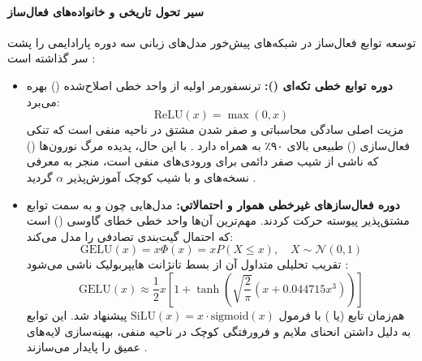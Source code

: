 \paragraph*{سیر تحول تاریخی و خانواده‌های فعال‌ساز}
توسعه توابع فعال‌ساز در شبکه‌های پیش‌خور مدل‌های زبانی سه دوره پارادایمی را پشت سر گذاشته است \cite{katirci2024evaluating}:
\begin{itemize}
    \item \textbf{دوره توابع خطی تکه‌ای ():} ترنسفورمر اولیه از واحد خطی اصلاح‌شده () \cite{nair2010relu} بهره می‌برد:
    \begin{equation}
        \text{ReLU}(x) = \max(0, x)
    \end{equation}
    مزیت اصلی  سادگی محاسباتی و صفر شدن مشتق در ناحیه منفی است که تنکی فعال‌سازی () طبیعی بالای ۹۰٪ به همراه دارد \cite{luo2024sparsing, madhyastha2026sparsity}. با این حال، پدیده مرگ نورون‌ها () که ناشی از شیب صفر دائمی برای ورودی‌های منفی است، منجر به معرفی نسخه‌های  و  با شیب کوچک آموزش‌پذیر $\alpha$ گردید \cite{he2015delving}.
    
    \item \textbf{دوره فعال‌ساز‌های غیرخطی هموار و احتمالاتي:} مدل‌هایی چون  و  به سمت توابع مشتق‌پذیر پیوسته حرکت کردند. مهم‌ترین آن‌ها واحد خطی خطای گاوسی () \cite{hendrycks2016gelu} است که احتمال گیت‌بندی تصادفی را مدل می‌کند:
    \begin{equation}
        \text{GELU}(x) = x \Phi(x) = x P(X \le x), \quad X \sim \mathcal{N}(0, 1)
    \end{equation}
    تقریب تحلیلی متداول آن از بسط تانژانت هایپربولیک ناشی می‌شود \cite{hendrycks2016gelu, tang2026rational}:
    \begin{equation}
        \text{GELU}(x) \approx \frac{1}{2}x \left[1 + \tanh\left(\sqrt{\frac{2}{\pi}}\left(x + 0.044715 x^3\right)\right)\right]
    \end{equation}
    هم‌زمان تابع  (یا ) \cite{ramachandran2017swish, elfwing2018silu} با فرمول $\text{SiLU}(x) = x \cdot \text{sigmoid}(x)$ پیشنهاد شد. این توابع به دلیل داشتن انحنای ملایم و فرورفتگی کوچک در ناحیه منفی، بهینه‌سازی لایه‌های عمیق را پایدار می‌سازند \cite{katirci2024evaluating, tang2026rational}.


\end{itemize}
